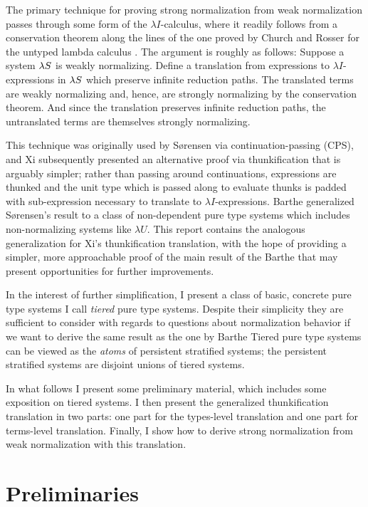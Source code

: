 \documentclass{article}
\begin{document}
The primary technique for proving strong normalization from weak normalization passes through some form of the $\lambda I$-calculus, where it readily follows from a conservation theorem along the lines of the one proved by Church and Rosser for the untyped lambda calculus \cite{church-rosser-1936}.
The argument is roughly as follows:
Suppose a system $\lambda S$ is weakly normalizing.
Define a translation from expressions to $\lambda I$-expressions in $\lambda S$ which preserve infinite reduction paths.
The translated terms are weakly normalizing and, hence, are strongly normalizing by the conservation theorem.
And since the translation preserves infinite reduction paths, the untranslated terms are themselves strongly normalizing.

This technique was originally used by S{\o}rensen \cite{sorensen-1997} via continuation-passing (CPS), and Xi \cite{xi-1997} subsequently presented an alternative proof via thunkification that is arguably simpler; rather than passing around continuations, expressions are thunked and the unit type which is passed along to evaluate thunks is padded with sub-expression necessary to translate to $\lambda I$-expressions.
Barthe \etal \cite{barthe-et-al-2001} generalized S{\o}rensen's result to a class of non-dependent pure type systems which includes non-normalizing systems like $\lambda U$.
This report contains the analogous generalization for Xi's thunkification translation, with the hope of providing a simpler, more approachable proof of the main result of the Barthe \etal that may present opportunities for further improvements.

In the interest of further simplification, I present a class of basic, concrete pure type systems I call \textit{tiered} pure type systems.
Despite their simplicity they are sufficient to consider with regards to questions about normalization behavior if we want to derive the same result as the one by Barthe \etal
Tiered pure type systems can be viewed as the \textit{atoms} of persistent stratified systems; the persistent stratified systems are disjoint unions of tiered systems.

In what follows I present some preliminary material, which includes some exposition on tiered systems.
I then present the generalized thunkification translation in two parts: one part for the types-level translation and one part for terms-level translation.
Finally, I show how to derive strong normalization from weak normalization with this translation.

\section{Preliminaries}
\end{document}
